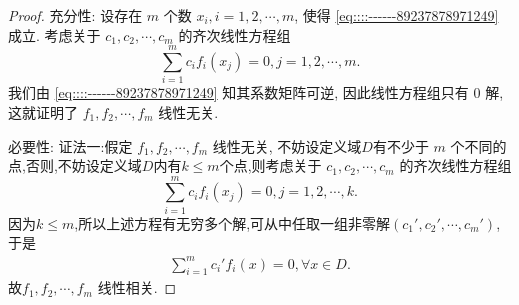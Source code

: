 \documentclass[../../main.tex]{subfiles}%
\begin{document}
\begin{proof}

{\heiti 充分性:} 设存在 \( m \) 个数 \( x_i, i = 1, 2, \cdots, m \), 使得 \eqref{eq::::------89237878971249} 成立. 考虑关于 \( c_1, c_2, \cdots, c_m \) 的齐次线性方程组
\[
\sum_{i=1}^m c_i f_i(x_j) = 0, j = 1, 2, \cdots, m.
\]
我们由 \eqref{eq::::------89237878971249} 知其系数矩阵可逆, 因此线性方程组只有 0 解, 这就证明了 \( f_1, f_2, \cdots, f_m \) 线性无关.

{\heiti 必要性:} {\color{blue}证法一:}假定 \( f_1, f_2, \cdots, f_m \) 线性无关, 不妨设定义域$D$有不少于 \( m \) 个不同的点,否则,不妨设定义域$D$内有$k\leqslant m$个点,则考虑关于 \( c_1, c_2, \cdots, c_m \) 的齐次线性方程组
\[
\sum_{i=1}^m c_i f_i(x_j) = 0, j = 1, 2, \cdots, k.
\]
因为$k\leqslant m$,所以上述方程有无穷多个解,可从中任取一组非零解$(c_1',c_2',\cdots,c_m')$,于是
\begin{align*}
\sum_{i=1}^m c_i' f_i(x) = 0, \forall x \in D.
\end{align*}
故\( f_1, f_2, \cdots, f_m \) 线性相关.


\end{proof}
\end{document}
